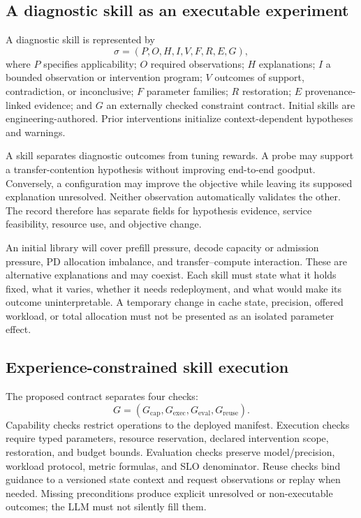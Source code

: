 \documentclass[11pt,a4paper]{article}
\begin{document}
\subsection{A diagnostic skill as an executable experiment}
A diagnostic skill is represented by
\begin{equation}
 \sigma=(P,O,H,I,V,F,R,E,G),
\end{equation}
where $P$ specifies applicability; $O$ required observations; $H$ explanations; $I$ a bounded observation or intervention program; $V$ outcomes of support, contradiction, or inconclusive; $F$ parameter families; $R$ restoration; $E$ provenance-linked evidence; and $G$ an externally checked constraint contract. Initial skills are engineering-authored. Prior interventions initialize context-dependent hypotheses and warnings.

A skill separates diagnostic outcomes from tuning rewards. A probe may support a transfer-contention hypothesis without improving end-to-end goodput. Conversely, a configuration may improve the objective while leaving its supposed explanation unresolved. Neither observation automatically validates the other. The record therefore has separate fields for hypothesis evidence, service feasibility, resource use, and objective change.

An initial library will cover prefill pressure, decode capacity or admission pressure, PD allocation imbalance, and transfer--compute interaction. These are alternative explanations and may coexist. Each skill must state what it holds fixed, what it varies, whether it needs redeployment, and what would make its outcome uninterpretable. A temporary change in cache state, precision, offered workload, or total allocation must not be presented as an isolated parameter effect.

\subsection{Experience-constrained skill execution}
The proposed contract separates four checks:
\begin{equation}
 G=(G_{\mathrm{cap}},G_{\mathrm{exec}},G_{\mathrm{eval}},G_{\mathrm{reuse}}).
\end{equation}
Capability checks restrict operations to the deployed manifest. Execution checks require typed parameters, resource reservation, declared intervention scope, restoration, and budget bounds. Evaluation checks preserve model/precision, workload protocol, metric formulas, and SLO denominator. Reuse checks bind guidance to a versioned state context and request observations or replay when needed. Missing preconditions produce explicit unresolved or non-executable outcomes; the LLM must not silently fill them.
\end{document}
